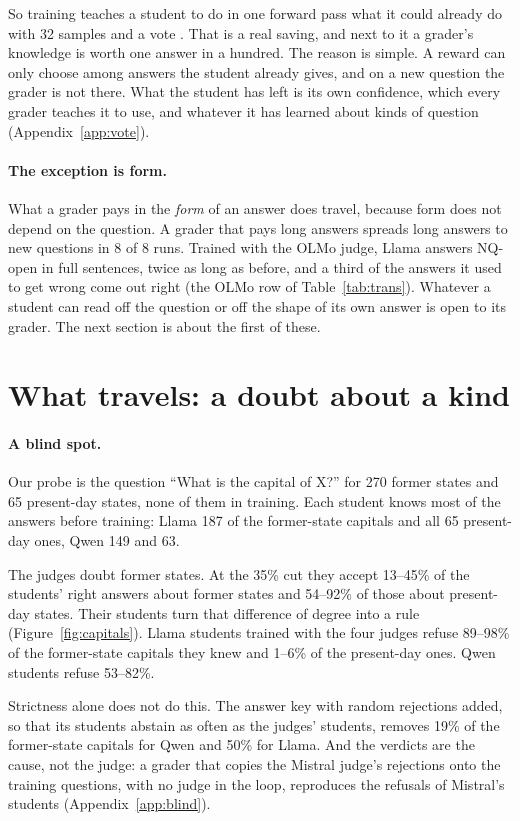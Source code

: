 \documentclass[11pt,a4paper,twocolumn]{article}
\begin{document}
So training teaches a student to do in one forward pass what it could already do with 32 samples and a vote \citep{wang2023sc}. That is a real saving, and next to it a grader's knowledge is worth one answer in a hundred. The reason is simple. A reward can only choose among answers the student already gives, and on a new question the grader is not there. What the student has left is its own confidence, which every grader teaches it to use, and whatever it has learned about kinds of question (Appendix~\ref{app:vote}).

\paragraph{The exception is form.} What a grader pays in the \emph{form} of an answer does travel, because form does not depend on the question. A grader that pays long answers spreads long answers to new questions in 8 of 8 runs. Trained with the OLMo judge, Llama answers NQ-open in full sentences, twice as long as before, and a third of the answers it used to get wrong come out right (the OLMo row of Table~\ref{tab:trans}). Whatever a student can read off the question or off the shape of its own answer is open to its grader. The next section is about the first of these.

\section{What travels: a doubt about a kind}
\label{sec:travel}

\paragraph{A blind spot.} Our probe is the question ``What is the capital of X?'' for 270 former states and 65 present-day states, none of them in training. Each student knows most of the answers before training: Llama 187 of the former-state capitals and all 65 present-day ones, Qwen 149 and 63.

The judges doubt former states. At the 35\% cut they accept 13--45\% of the students' right answers about former states and 54--92\% of those about present-day states. Their students turn that difference of degree into a rule (Figure~\ref{fig:capitals}). Llama students trained with the four judges refuse 89--98\% of the former-state capitals they knew and 1--6\% of the present-day ones. Qwen students refuse 53--82\%.

Strictness alone does not do this. The answer key with random rejections added, so that its students abstain as often as the judges' students, removes 19\% of the former-state capitals for Qwen and 50\% for Llama. And the verdicts are the cause, not the judge: a grader that copies the Mistral judge's rejections onto the training questions, with no judge in the loop, reproduces the refusals of Mistral's students (Appendix~\ref{app:blind}).
\end{document}
